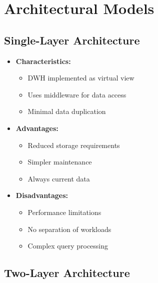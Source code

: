 \section{Architectural Models}

\subsection{Single-Layer Architecture}

\begin{itemize}
    \item \textbf{Characteristics:}
        \begin{itemize}
            \item DWH implemented as virtual view
            \item Uses middleware for data access
            \item Minimal data duplication
        \end{itemize}
    \item \textbf{Advantages:}
        \begin{itemize}
            \item Reduced storage requirements
            \item Simpler maintenance
            \item Always current data
        \end{itemize}
    \item \textbf{Disadvantages:}
        \begin{itemize}
            \item Performance limitations
            \item No separation of workloads
            \item Complex query processing
        \end{itemize}
\end{itemize}


\subsection{Two-Layer Architecture}


